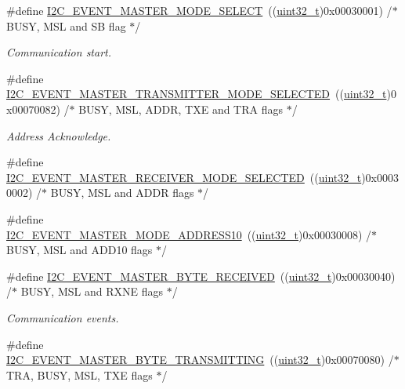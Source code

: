 \begin{DoxyCompactItemize}
\#define \hyperlink{group___i2_c___events_gaeef8c22ac035122b06e31b360ac7aeb3}{I2\+C\+\_\+\+E\+V\+E\+N\+T\+\_\+\+M\+A\+S\+T\+E\+R\+\_\+\+M\+O\+D\+E\+\_\+\+S\+E\+L\+E\+CT}~((\hyperlink{_p_e___types_8h_a33594304e786b158f3fb30289278f5af}{uint32\+\_\+t})0x00030001)  /$\ast$ B\+U\+S\+Y, M\+S\+L and S\+B flag $\ast$/
\begin{DoxyCompactList}\small\item\em Communication start. \end{DoxyCompactList}\item 
\#define \hyperlink{group___i2_c___events_ga2361a6e60b7dc86fb682dd06fbd3edb7}{I2\+C\+\_\+\+E\+V\+E\+N\+T\+\_\+\+M\+A\+S\+T\+E\+R\+\_\+\+T\+R\+A\+N\+S\+M\+I\+T\+T\+E\+R\+\_\+\+M\+O\+D\+E\+\_\+\+S\+E\+L\+E\+C\+T\+ED}~((\hyperlink{_p_e___types_8h_a33594304e786b158f3fb30289278f5af}{uint32\+\_\+t})0x00070082)  /$\ast$ B\+U\+S\+Y, M\+S\+L, A\+D\+D\+R, T\+X\+E and T\+R\+A flags $\ast$/
\begin{DoxyCompactList}\small\item\em Address Acknowledge. \end{DoxyCompactList}\item 
\#define \hyperlink{group___i2_c___events_gabfde82864432ddb87b6462234d542e60}{I2\+C\+\_\+\+E\+V\+E\+N\+T\+\_\+\+M\+A\+S\+T\+E\+R\+\_\+\+R\+E\+C\+E\+I\+V\+E\+R\+\_\+\+M\+O\+D\+E\+\_\+\+S\+E\+L\+E\+C\+T\+ED}~((\hyperlink{_p_e___types_8h_a33594304e786b158f3fb30289278f5af}{uint32\+\_\+t})0x00030002)  /$\ast$ B\+U\+S\+Y, M\+S\+L and A\+D\+D\+R flags $\ast$/
\item 
\#define \hyperlink{group___i2_c___events_gad04882597bbf542c6fee7a9c837fbc8c}{I2\+C\+\_\+\+E\+V\+E\+N\+T\+\_\+\+M\+A\+S\+T\+E\+R\+\_\+\+M\+O\+D\+E\+\_\+\+A\+D\+D\+R\+E\+S\+S10}~((\hyperlink{_p_e___types_8h_a33594304e786b158f3fb30289278f5af}{uint32\+\_\+t})0x00030008)  /$\ast$ B\+U\+S\+Y, M\+S\+L and A\+D\+D10 flags $\ast$/
\item 
\#define \hyperlink{group___i2_c___events_ga6bcf2ae49961e07e27cf9fdf334719e3}{I2\+C\+\_\+\+E\+V\+E\+N\+T\+\_\+\+M\+A\+S\+T\+E\+R\+\_\+\+B\+Y\+T\+E\+\_\+\+R\+E\+C\+E\+I\+V\+ED}~((\hyperlink{_p_e___types_8h_a33594304e786b158f3fb30289278f5af}{uint32\+\_\+t})0x00030040)  /$\ast$ B\+U\+S\+Y, M\+S\+L and R\+X\+N\+E flags $\ast$/
\begin{DoxyCompactList}\small\item\em Communication events. \end{DoxyCompactList}\item 
\#define \hyperlink{group___i2_c___events_ga037ac1e67e44ee085acac6f034bd73b2}{I2\+C\+\_\+\+E\+V\+E\+N\+T\+\_\+\+M\+A\+S\+T\+E\+R\+\_\+\+B\+Y\+T\+E\+\_\+\+T\+R\+A\+N\+S\+M\+I\+T\+T\+I\+NG}~((\hyperlink{_p_e___types_8h_a33594304e786b158f3fb30289278f5af}{uint32\+\_\+t})0x00070080) /$\ast$ T\+R\+A, B\+U\+S\+Y, M\+S\+L, T\+X\+E flags $\ast$/

\end{DoxyCompactItemize}
